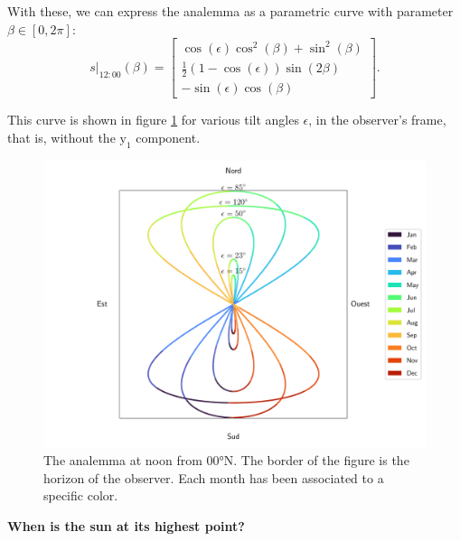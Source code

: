 \documentclass[12pt]{article}
\begin{document}
With these, we can express the analemma as a parametric curve with parameter 
$\beta \in [0,2\pi]$:
\begin{equation}
    s\vert_{12:00}(\beta) =
    \begin{bmatrix}
        \cos(\epsilon)\cos^2(\beta) + \sin^2(\beta)\\
        \tfrac{1}{2}(1-\cos(\epsilon)) \sin(2\beta)\\
        -\sin(\epsilon) \cos(\beta)
    \end{bmatrix}.
\end{equation}

This curve is shown in figure \ref{fig:analemma_easy} for various 
tilt angles $\epsilon$, in the observer's frame, that is, without the 
$\mathrm{y}_1$ component.

\begin{figure}[ht]
    \centering
    \includegraphics[width=\textwidth]{./analemma_plot.pdf}
    \caption{
        The analemma at noon from 00°N. The border of the figure is the
        horizon of the observer. Each month has been associated to a specific 
        color.
    }
    \label{fig:analemma_easy}
\end{figure}


\textbf{When is the sun at its highest point?}
\end{document}
